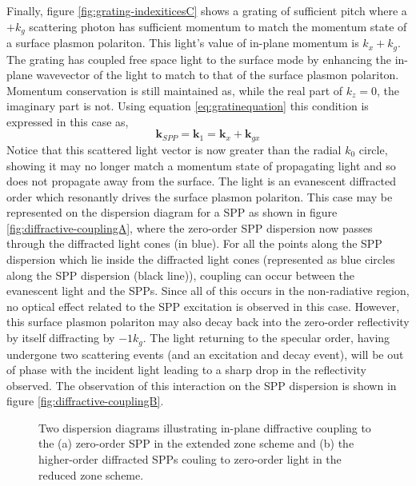 Finally, figure \ref{fig:grating-indexiticesC} shows a grating of sufficient pitch where a $+k_g$ scattering photon has sufficient momentum to match the momentum state of a surface plasmon polariton. This light's value of in-plane momentum is $k_x+k_g$. The grating has coupled free space light to the surface mode by enhancing the in-plane wavevector of the light to match to that of the surface plasmon polariton. Momentum conservation is still maintained as, while the real part of $k_z=0$, the imaginary part is not. Using equation \ref{eq:gratinequation} this condition is expressed in this case as,
\begin{equation}
\mathbf{k}_{SPP}=\mathbf{k}_1=\mathbf{k}_x + \mathbf{k}_{gx}
\end{equation}
Notice that this scattered light vector is now greater than the radial $k_0$ circle, showing it may no longer match a momentum state of propagating light and so does not propagate away from the surface. The light is an evanescent diffracted order which resonantly drives the surface plasmon polariton. This case may be represented on the dispersion diagram for a SPP as shown in figure \ref{fig:diffractive-couplingA}, where the zero-order SPP dispersion now passes through the diffracted light cones (in blue). For all the points along the SPP dispersion which lie inside the diffracted light cones (represented as blue circles along the SPP dispersion (black line)), coupling can occur between the evanescent light and the SPPs. Since all of this occurs in the non-radiative region, no optical effect related to the SPP excitation is observed in this case. However, this surface plasmon polariton may also decay back into the zero-order reflectivity by itself diffracting by $-1k_g$. The light returning to the specular order, having undergone two scattering events (and an excitation and decay event), will be out of phase with the incident light leading to a sharp drop in the reflectivity observed. The observation of this interaction on the SPP dispersion is shown in figure \ref{fig:diffractive-couplingB}.
\begin{figure}
\centering
		\subfigure[]{
		\centering\label{fig:diffractive-couplingA}
}
		\subfigure[]{
		\centering\label{fig:diffractive-couplingB}
		}
	\caption[Two dispersion diagrams illustrating in-plane diffractive coupling to the zero-order SPP in the extended zone scheme, and the higher-order diffracted SPPs couling to zero-order light in the reduced zone scheme]{Two dispersion diagrams illustrating in-plane diffractive coupling to the (a) zero-order SPP in the extended zone scheme and (b) the higher-order diffracted SPPs couling to zero-order light in the reduced zone scheme.\label{fig:diffractive-coupling}}
\end{figure}
